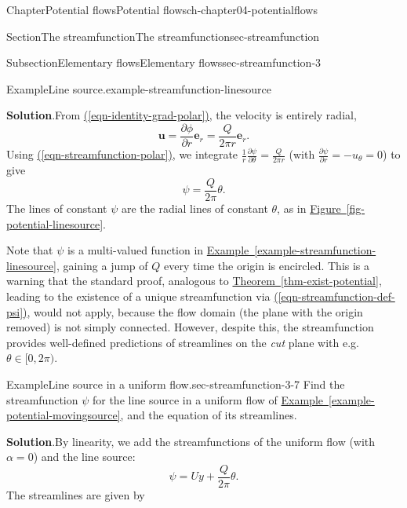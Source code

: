\documentclass[oneside,10pt,]{book}
\newcommand{\blocktitlefont}{\relax}
\newcommand{\xreffont}{\relax}
\numberwithin{equation}{section}
\newcommand{\pd}[2]{\frac{\partial#1}{\partial#2}}
\newcommand{\be}{\boldsymbol{e}}
\newcommand{\bu}{\boldsymbol{u}}
\begin{document}
\begin{chapterptx}{Chapter}{Potential flows}{}{Potential flows}{}{}{ch-chapter04-potentialflows}
\begin{sectionptx}{Section}{The streamfunction}{}{The streamfunction}{}{}{sec-streamfunction}
\begin{subsectionptx}{Subsection}{Elementary flows}{}{Elementary flows}{}{}{sec-streamfunction-3}
\begin{example}{Example}{Line source.}{example-streamfunction-linesource}
\par\smallskip%
\noindent\textbf{\blocktitlefont Solution}.\hypertarget{example-streamfunction-linesource-4}{}\quad{}From \hyperref[eqn-identity-grad-polar]{({\xreffont\ref{eqn-identity-grad-polar}})}, the velocity is entirely radial,%
\begin{equation}
\bu = \pd{\phi}{r}\be_r = \frac{Q}{2\pi r} \be_r.\label{eqn-streamfunction-u-linesource}
\end{equation}
Using \hyperref[eqn-streamfunction-polar]{({\xreffont\ref{eqn-streamfunction-polar}})}, we integrate \(\frac{1}{r} \pd{\psi}{\theta} = \frac{Q}{2\pi r}\) (with \(\pd{\psi}{r} = -u_\theta = 0\)) to give%
\begin{equation*}
\psi = \frac{Q}{2\pi} \theta.
\end{equation*}
The lines of constant \(\psi\) are the radial lines of constant \(\theta\), as in \hyperref[fig-potential-linesource]{Figure~{\xreffont\ref{fig-potential-linesource}}}.%
\end{example}
Note that \(\psi\) is a multi-valued function in \hyperref[example-streamfunction-linesource]{Example~{\xreffont\ref{example-streamfunction-linesource}}}, gaining a jump of \(Q\) every time the origin is encircled. This is a warning that the standard proof, analogous to \hyperref[thm-exist-potential]{Theorem~{\xreffont\ref{thm-exist-potential}}}, leading to the existence of a unique streamfunction via \hyperref[eqn-streamfunction-def-psi]{({\xreffont\ref{eqn-streamfunction-def-psi}})}, would not apply, because the flow domain (the plane with the origin removed) is not simply connected. However, despite this, the streamfunction provides well-defined predictions of streamlines on the \emph{cut} plane with e.g. \(\theta \in [0, 2\pi)\).%
\begin{example}{Example}{Line source in a uniform flow.}{sec-streamfunction-3-7}%
Find the streamfunction \(\psi\) for the line source in a uniform flow of \hyperref[example-potential-movingsource]{Example~{\xreffont\ref{example-potential-movingsource}}}, and the equation of its streamlines.%
\par\smallskip%
\noindent\textbf{\blocktitlefont Solution}.\hypertarget{sec-streamfunction-3-7-3}{}\quad{}By linearity, we add the streamfunctions of the uniform flow (with \(\alpha = 0\)) and the line source:%
\begin{equation*}
\psi = Uy + \frac{Q}{2\pi}\theta.
\end{equation*}
The streamlines are given by%
\begin{equation*}

\end{equation*}
\end{example}
\end{subsectionptx}
\end{sectionptx}
\end{chapterptx}
\end{document}
